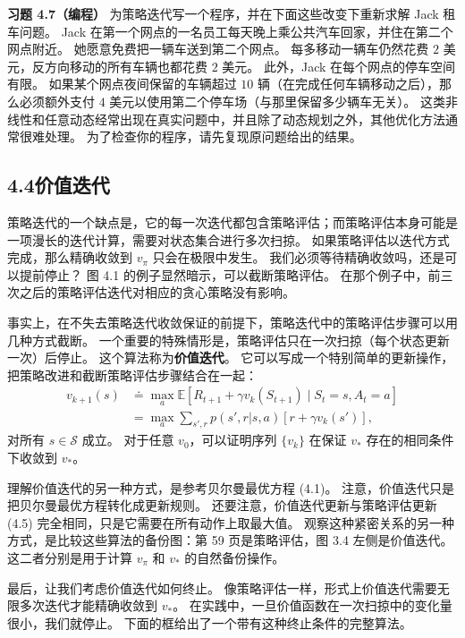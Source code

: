 \documentclass[UTF8, 12pt, fontset=fandol, oneside]{ctexart}
\begin{document}
\noindent\textbf{习题 4.7（编程）}
为策略迭代写一个程序，并在下面这些改变下重新求解 Jack 租车问题。
Jack 在第一个网点的一名员工每天晚上乘公共汽车回家，并住在第二个网点附近。
她愿意免费把一辆车送到第二个网点。
每多移动一辆车仍然花费 $2$ 美元，反方向移动的所有车辆也都花费 $2$ 美元。
此外，Jack 在每个网点的停车空间有限。
如果某个网点夜间保留的车辆超过 $10$ 辆（在完成任何车辆移动之后），那么必须额外支付 $4$ 美元以使用第二个停车场（与那里保留多少辆车无关）。
这类非线性和任意动态经常出现在真实问题中，并且除了动态规划之外，其他优化方法通常很难处理。
为了检查你的程序，请先复现原问题给出的结果。

\subsection*{4.4\quad 价值迭代}

策略迭代的一个缺点是，它的每一次迭代都包含策略评估；而策略评估本身可能是一项漫长的迭代计算，需要对状态集合进行多次扫掠。
如果策略评估以迭代方式完成，那么精确收敛到 $v_\pi$ 只会在极限中发生。
我们必须等待精确收敛吗，还是可以提前停止？
图 4.1 的例子显然暗示，可以截断策略评估。
在那个例子中，前三次之后的策略评估迭代对相应的贪心策略没有影响。

事实上，在不失去策略迭代收敛保证的前提下，策略迭代中的策略评估步骤可以用几种方式截断。
一个重要的特殊情形是，策略评估只在一次扫掠（每个状态更新一次）后停止。
这个算法称为\textbf{价值迭代}。
它可以写成一个特别简单的更新操作，把策略改进和截断策略评估步骤结合在一起：
\begin{equation}
\begin{aligned}
v_{k+1}(s)
&\doteq \max_a \mathbb{E}\!\left[R_{t+1}+\gamma v_k(S_{t+1}) \mid S_t=s,A_t=a\right] \\
&= \max_a \sum_{s',r}p(s',r|s,a)\left[r+\gamma v_k(s')\right],
\end{aligned}
\tag{4.10}
\end{equation}
对所有 $s\in\mathcal{S}$ 成立。
对于任意 $v_0$，可以证明序列 $\{v_k\}$ 在保证 $v_*$ 存在的相同条件下收敛到 $v_*$。

理解价值迭代的另一种方式，是参考贝尔曼最优方程 (4.1)。
注意，价值迭代只是把贝尔曼最优方程转化成更新规则。
还要注意，价值迭代更新与策略评估更新 (4.5) 完全相同，只是它需要在所有动作上取最大值。
观察这种紧密关系的另一种方式，是比较这些算法的备份图：第 59 页是策略评估，图 3.4 左侧是价值迭代。
这二者分别是用于计算 $v_\pi$ 和 $v_*$ 的自然备份操作。

最后，让我们考虑价值迭代如何终止。
像策略评估一样，形式上价值迭代需要无限多次迭代才能精确收敛到 $v_*$。
在实践中，一旦价值函数在一次扫掠中的变化量很小，我们就停止。
下面的框给出了一个带有这种终止条件的完整算法。
\end{document}

